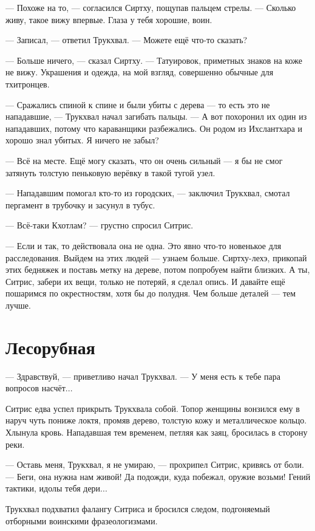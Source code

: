 \documentclass[a4paper,10pt,fleqn]{book}\usepackage{cooltooltips}\usepackage{polyglossia}\setdefaultlanguage{english}\setotherlanguage{russian}\defaultfontfeatures{Ligatures=TeX,Mapping=tex-text} \usepackage{xcolor}\definecolor{lightgray}{HTML}{bbbbbb}\color{lightgray}\newcommand{\ml}[3]{\textcolor{black}{#3}}
\begin{document}
--- Похоже на то, --- согласился Сиртху, пощупав пальцем стрелы.
--- Сколько живу, такое вижу впервые.
Глаза у тебя хорошие, воин.

--- Записал, --- ответил Трукхвал.
--- Можете ещё что-то сказать?

--- Больше ничего, --- сказал Сиртху.
--- Татуировок, приметных знаков на коже не вижу.
Украшения и одежда, на мой взгляд, совершенно обычные для тхитронцев.

--- Сражались спиной к спине и были убиты с дерева --- то есть это не нападавшие, --- Трукхвал начал загибать пальцы.
--- А вот похоронил их один из нападавших, потому что караванщики разбежались.
Он родом из Ихслантхара и хорошо знал убитых.
Я ничего не забыл?

--- Всё на месте.
Ещё могу сказать, что он очень сильный --- я бы не смог затянуть толстую пеньковую верёвку в такой тугой узел.

--- Нападавшим помогал кто-то из городских, --- заключил Трукхвал, смотал пергамент в трубочку и засунул в тубус.

--- Всё-таки Кхотлам? --- грустно спросил Ситрис.

--- Если и так, то действовала она не одна.
Это явно что-то новенькое для расследования.
Выйдем на этих людей --- узнаем больше.
Сиртху-лехэ, прикопай этих бедняжек и поставь метку на дереве, потом попробуем найти близких.
А ты, Ситрис, забери их вещи, только не потеряй, я сделал опись.
И давайте ещё пошаримся по окрестностям, хотя бы до полудня.
Чем больше деталей --- тем лучше.

\section{Лесорубная}

--- Здравствуй, --- приветливо начал Трукхвал.
--- У меня есть к тебе пара вопросов насчёт...

Ситрис едва успел прикрыть Трукхвала собой.
Топор женщины вонзился ему в наруч чуть пониже локтя, промяв дерево, толстую кожу и металлическое кольцо.
Хлынула кровь.
Нападавшая тем временем, петляя как заяц, бросилась в сторону реки.

--- Оставь меня, Трукхвал, я не умираю, --- прохрипел Ситрис, кривясь от боли.
--- Беги, она нужна нам живой!
Да подожди, куда побежал, оружие возьми!
Гений тактики, идолы тебя дери...

Трукхвал подхватил фалангу Ситриса и бросился следом, подгоняемый отборными воинскими фразеологизмами.
\end{document}

